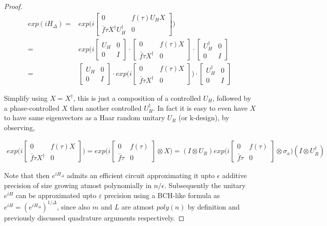 \documentclass[10pt]{amsart}
\begin{document}
\begin{proof}
\begin{align}
    exp(i H_\Delta) = & exp\big( i \begin{bmatrix}
0 & f(\tau) U_H X \\
\bar{f}{\tau} X^{\dagger}U_H^{\dagger} & 0
\end{bmatrix}  \big)    \\
=  & exp\big(i 
\begin{bmatrix}
U_H & 0 \\
0 & I 
\end{bmatrix} \cdot
\begin{bmatrix}
0 & f(\tau) X \\
\bar{f}{\tau} X^{\dagger} & 0
\end{bmatrix} \cdot
\begin{bmatrix} 
U_H^{\dagger} & 0 \\
0 & I 
\end{bmatrix} 
\\
= &  
\begin{bmatrix}
U_H & 0 \\
0 & I 
\end{bmatrix}  \cdot
exp\big(i \begin{bmatrix}
0 & f(\tau) X \\
\bar{f}{\tau} X^{\dagger} & 0
\end{bmatrix} \big) \cdot
\begin{bmatrix}
U_H^{\dagger} & 0 \\
0 & I 
\end{bmatrix} 
\end{align}

Simplify using $X = X^{\dagger}$, this is just a composition of a controlled $U_H$, followed by a phase-controlled $X$ then another controlled $U_H^{\dagger}$. In fact it is easy to even have $X$ to have same eigenvectors as a Haar random unitary $U_R$ (or k-design), by observing,

\begin{align}
    exp\big(i \begin{bmatrix}
0 & f(\tau) X \\
\bar{f}{\tau} X^{\dagger} & 0
\end{bmatrix} \big)  =  exp\big(i \begin{bmatrix}
0 & f(\tau) \\
\bar{f}{\tau} & 0
\end{bmatrix} \otimes X \big) = (I\otimes U_R ) exp\big(i \begin{bmatrix}
0 & f(\tau) \\
\bar{f}{\tau} & 0
\end{bmatrix} \otimes \sigma_x \big) (I\otimes U_R^{\dagger} )
\end{align}

Note that then $e^{iH_{\Delta}}$ admits an efficient circuit approximating it upto $\epsilon$ additive precision of size growing atmost polynomially in $n/\epsilon$. Subsequently the unitary $e^{iH}$ can be approximated upto $\varepsilon$ precision using a BCH-like formula as $e^{iH}= (e^{iH_{\Delta}})^{1/\Delta}$, since also $m$ and $L$ are atmost $poly(n)$ by definition and previously discussed quadrature arguments respectively. 
\end{proof}
\end{document}
